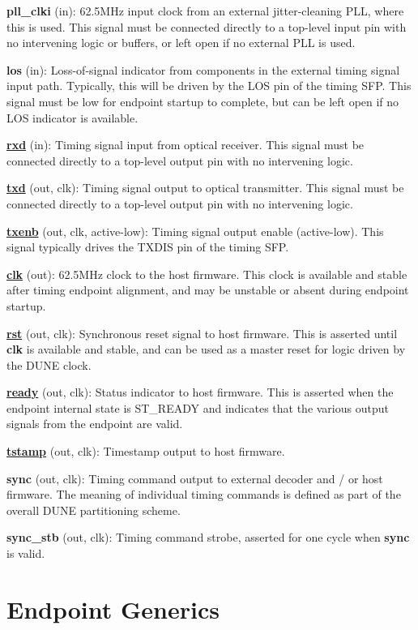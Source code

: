 \documentclass{article}
\begin{document}
\textbf{pll\_clki} (in): 62.5MHz input clock from an external jitter-cleaning PLL, where this is used. This signal must be connected directly to a top-level input pin with no intervening logic or buffers, or left open if no external PLL is used.

\textbf{los} (in): Loss-of-signal indicator from components in the external timing signal input path. Typically, this will be driven by the LOS pin of the timing SFP. This signal must be low for endpoint startup to complete, but can be left open if no LOS indicator is available.

\textbf{\uline{rxd}} (in): Timing signal input from optical receiver. This signal must be connected directly to a top-level output pin with no intervening logic.

\textbf{\uline{txd}} (out, clk): Timing signal output to optical transmitter. This signal must be connected directly to a top-level output pin with no intervening logic.

\textbf{\uline{txenb}} (out, clk, active-low): Timing signal output enable (active-low). This signal typically drives the TXDIS pin of the timing SFP.

\textbf{\uline{clk}} (out): 62.5MHz clock to the host firmware. This clock is available and stable after timing endpoint alignment, and may be unstable or absent during endpoint startup.

\textbf{\uline{rst}} (out, clk): Synchronous reset signal to host firmware. This is asserted until \textbf{clk} is available and stable, and can be used as a master reset for logic driven by the DUNE clock.

\textbf{\uline{ready}} (out, clk): Status indicator to host firmware. This is asserted when the endpoint internal state is ST\_READY and indicates that the various output signals from the endpoint are valid.

\textbf{\uline{tstamp}} (out, clk): Timestamp output to host firmware.

\textbf{sync} (out, clk): Timing command output to external decoder and / or host firmware. The meaning of individual timing commands is defined as part of the overall DUNE partitioning scheme.

\textbf{sync\_stb} (out, clk): Timing command strobe, asserted for one cycle when \textbf{sync} is valid.

\section{Endpoint Generics}
\end{document}
